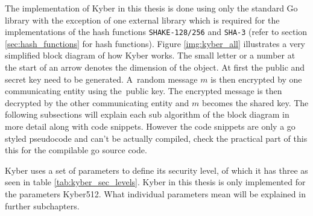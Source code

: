 The implementation of Kyber in this thesis is done using only the standard Go library with the exception of one external library \cite{00fV2cvg7Z6H2tS3} which is required for the implementations of the hash functions \texttt{SHAKE-128/256} and \texttt{SHA-3} (refer to section \ref{sec:hash_functions} for hash functions). Figure \ref{img:kyber_all} illustrates a very simplified block diagram of how Kyber works. The small letter or a number at the start of an arrow denotes the dimension of the object. At first the public and secret key need to be generated. A~random message $m$ is then encrypted by one communicating entity using the~public key. The encrypted message is then decrypted by the other communicating entity and $m$ becomes the shared key. The following subsections will explain each sub algorithm of the block diagram in more detail along with code snippets. However the code snippets are only a go styled pseudocode and can't be actually compiled, check the practical part of this this for the compilable go source code.

Kyber uses a set of parameters to define its security level, of which it has three as seen in table \ref{tab:kyber_sec_levels}. Kyber in this thesis is only implemented for the parameters Kyber512. What individual parameters mean will be explained in further subchapters.

